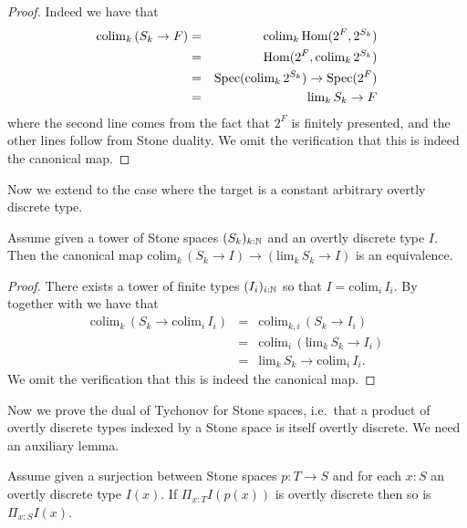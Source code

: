 \begin{proof}
Indeed we have that
\begin{eqnarray}
\mathrm{colim}_k\,(S_k\to F) &=& \mathrm{colim}_k\, \mathrm{Hom}(2^F, 2^{S_k})\nonumber\\
&=& \mathrm{Hom}(2^F, \mathrm{colim}_k\,2^{S_k})\nonumber\\
&=& \operatorname{Spec}(\mathrm{colim}_k\,2^{S_k})\to \operatorname{Spec}(2^F) \nonumber\\
&=& \mathrm{lim}_k\,S_k\to F\nonumber
\end{eqnarray}
where the second line comes from the fact that $2^F$ is finitely presented, and the other lines follow from Stone duality. We omit the verification that this is indeed the canonical map.
\end{proof}

Now we extend to the case where the target is a constant arbitrary overtly discrete type.

\begin{proposition}\label{scott-continuity-left}
Assume given a tower of Stone spaces $(S_k)_{k:\mathbb{N}}$ and an overtly discrete type $I$. Then the canonical map $\mathrm{colim}_k\,(S_k\to I)\to \left(\mathrm{lim}_k\,S_k\to I\right)$ is an equivalence.
\end{proposition}

\begin{proof}
There exists a tower of finite types $(I_i)_{i:\mathbb{N}}$ so that $I = \mathrm{colim}_i\,I_i$. By  together with  we have that
\begin{eqnarray}
\mathrm{colim}_k\,(S_k\to \mathrm{colim}_i\,I_i) &=& \mathrm{colim}_{k,i}\,(S_k\to I_i)\nonumber\\
&=& \mathrm{colim}_i\,(\mathrm{lim}_k\,S_k\to I_i)\nonumber\\
&=& \mathrm{lim}_k\,S_k\to \mathrm{colim}_i\,I_i.\nonumber
\end{eqnarray}
We omit the verification that this is indeed the canonical map.
\end{proof}

Now we prove the dual of Tychonov for Stone spaces, i.e.\ that a product of overtly discrete types indexed by a Stone space is itself overtly discrete. We need an auxiliary lemma.

\begin{lemma}\label{tychonov-dual-auxiliary}
Assume given a surjection between Stone spaces $p:T\to S$ and for each $x:S$ an overtly discrete type $I(x)$. If $\Pi_{x:T}I(p(x))$ is overtly discrete then so is $\Pi_{x:S}I(x)$.
\end{lemma}

